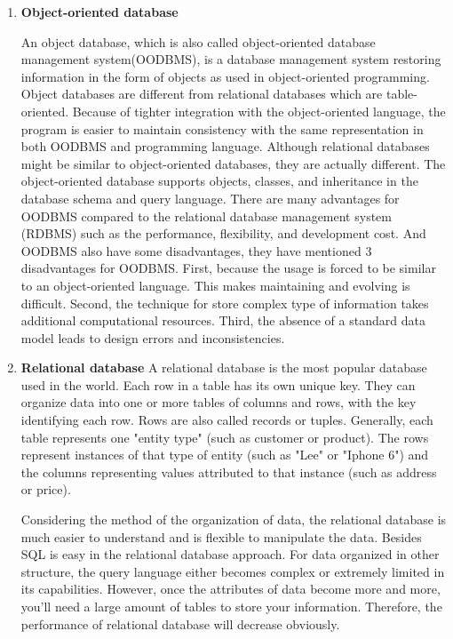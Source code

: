 \begin{enumerate}
	
	
	\item\textbf{Object-oriented database}
	\setlength{\parindent}{1em}		
	
	An object database, which is also called object-oriented database management system(OODBMS), is a database management system 
	restoring information in the form of objects as used in object-oriented programming.
	Object databases are different from relational databases which are table-oriented.
	Because of tighter integration with the object-oriented language, 
	the program is easier to maintain consistency with the same representation in both OODBMS and programming language.
	Although relational databases might be similar to object-oriented databases, they are actually different.
	The object-oriented database supports objects, classes, and inheritance in the database schema and query language.
	There are many advantages for OODBMS compared to the relational database management system (RDBMS) such as the performance, flexibility, and development cost.
	And OODBMS also have some disadvantages, they have mentioned 3 disadvantages for OODBMS.
	First, because the usage is forced to be similar to an object-oriented language.
	This makes maintaining and evolving is difficult.
	Second, the technique for store complex type of information takes additional computational resources.
	Third, the absence of a standard data model leads to design errors and inconsistencies.
	
	
	
	\item\textbf{Relational database}
	\setlength{\parindent}{1em}	
	A relational database is the most popular database used in the world.
	Each row in a table has its own unique key. 
	They can organize data into one or more tables of columns and rows, with the key identifying each row.
	Rows are also called records or tuples.
	Generally, each table represents one "entity type" (such as customer or product).
	The rows represent instances of that type of entity (such as "Lee" or "Iphone 6") 
	and the columns representing values attributed to that instance (such as address or price).
	
	Considering the method of the organization of data, the relational database is much easier to understand and is flexible to manipulate the data.
	Besides SQL is easy in the relational database approach.
	For data organized in other structure, the query language either becomes complex or extremely limited in its capabilities.
	However, once the attributes of data become more and more, you'll need a large amount of tables to store your information.
	Therefore, the performance of relational database will decrease obviously.



\end{enumerate}

